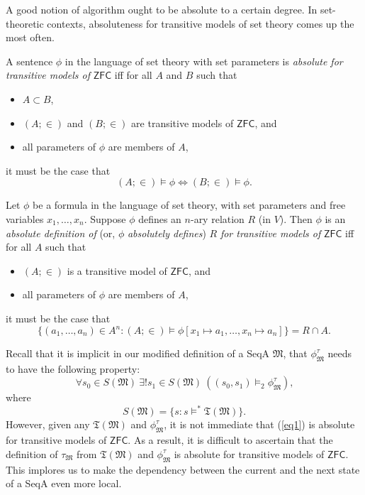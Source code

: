 \documentclass[12pt]{article}
\numberwithin{equation}{section}
\begin{document}
A good notion of algorithm ought to be absolute to a certain degree. In set-theoretic contexts, absoluteness for transitive models of set theory comes up the most often. 

\begin{defi}
A sentence $\phi$ in the language of set theory with set parameters is \emph{absolute for transitive models of} $\mathsf{ZFC}$ iff for all $A$ and $B$ such that
\begin{itemize}
    \item $A \subset B$,
    \item $(A; \in)$ and $(B; \in)$ are transitive models of $\mathsf{ZFC}$, and
    \item all parameters of $\phi$ are members of $A$,
\end{itemize}
it must be the case that
\begin{equation*}
    (A; \in) \models \phi \iff (B; \in) \models \phi \text{.}
\end{equation*}
\end{defi}

\begin{defi}
Let $\phi$ be a formula in the language of set theory, with set parameters and free variables $x_1, \dots, x_n$. Suppose $\phi$ defines an $n$-ary relation $R$ (in $V$). Then $\phi$ is an \emph{absolute definition of} (or, $\phi$ \emph{absolutely defines}) $R$ \emph{for transitive models of} $\mathsf{ZFC}$ iff for all $A$ such that
\begin{itemize}
    \item $(A; \in)$ is a transitive model of $\mathsf{ZFC}$, and
    \item all parameters of $\phi$ are members of $A$,
\end{itemize}
it must be the case that
\begin{equation*}
     \{(a_1, \dots, a_n) \in A^n : (A; \in) \models \phi[x_1 \mapsto a_1, \dots, x_n \mapsto a_n]\} = R \cap A \text{.}
\end{equation*}
\end{defi}

Recall that it is implicit in our modified definition of a SeqA $\mathfrak{M}$, that $\phi^{\tau}_{\mathfrak{M}}$ needs to have the following property:
\begin{equation}\label{eq1}
    \forall s_0 \in S(\mathfrak{M}) \ \exists ! s_1 \in S(\mathfrak{M}) \ ((s_0, s_1) \models_2 \phi^{\tau}_{\mathfrak{M}}) \text{,}
\end{equation}
where
\begin{equation*}
    S(\mathfrak{M}) = \{s : s \models^* \mathfrak{T}(\mathfrak{M})\} \text{.}
\end{equation*}
However, given any $\mathfrak{T}(\mathfrak{M})$ and $\phi^{\tau}_{\mathfrak{M}}$, it is not immediate that (\ref{eq1}) is absolute for transitive models of $\mathsf{ZFC}$. As a result, it is difficult to ascertain that the definition of $\tau_{\mathfrak{M}}$ from $\mathfrak{T}(\mathfrak{M})$ and $\phi^{\tau}_{\mathfrak{M}}$ is absolute for transitive models of $\mathsf{ZFC}$. This implores us to make the dependency between the current and the next state of a SeqA even more local.
\end{document}
